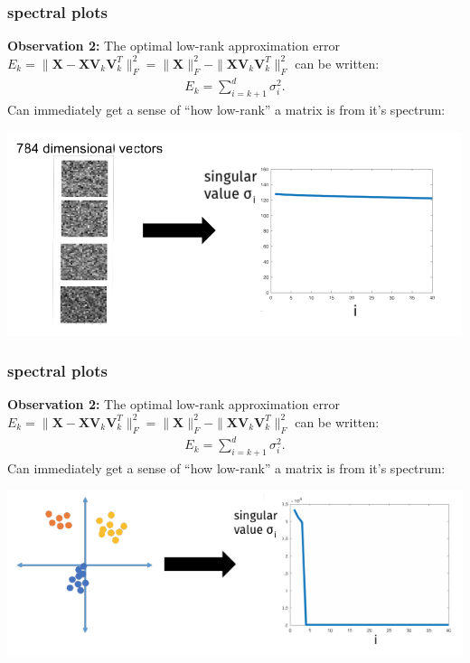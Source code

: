 \documentclass[compress]{beamer}
\newcommand{\bv}[1]{\mathbf{#1}}
\begin{document}
\begin{frame}[t]
	\frametitle{spectral plots}
	\textbf{Observation 2:}
	The optimal low-rank approximation error $E_k = \|\bv{X} - \bv{X}\bv{V}_k\bv{V}_k^T\|_F^2 = \|\bv{X}\|_F^2 - \|\bv{X}\bv{V}_k\bv{V}_k^T\|_F^2$ can be written:
	\begin{align*}
	E_k = \sum_{i=k+1}^d \sigma_i^2.
	\end{align*}
	Can immediately get a sense of ``how low-rank'' a matrix is from it's spectrum:
	\begin{center}
		\includegraphics[width=.8\textwidth]{noise_spectrum.png}
	\end{center}
\end{frame}

\begin{frame}[t]
	\frametitle{spectral plots}
	\textbf{Observation 2:}
	The optimal low-rank approximation error $E_k = \|\bv{X} - \bv{X}\bv{V}_k\bv{V}_k^T\|_F^2 = \|\bv{X}\|_F^2 - \|\bv{X}\bv{V}_k\bv{V}_k^T\|_F^2$ can be written:
	\begin{align*}
	E_k = \sum_{i=k+1}^d \sigma_i^2.
	\end{align*}
	Can immediately get a sense of ``how low-rank'' a matrix is from it's spectrum:
	\begin{center}
		\includegraphics[width=.8\textwidth]{cluster_spectrum.png}
	\end{center}
\end{frame}
\end{document}

